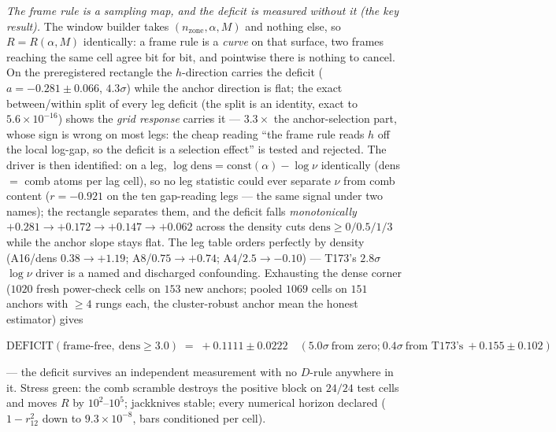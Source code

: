 \documentclass[11pt,a4paper]{article}
\begin{document}
\emph{The frame rule is a sampling map, and the deficit is measured
without it (the key result).} The window builder takes
$(n_{\mathrm{zone}},\alpha,M)$ and nothing else, so $R=R(\alpha,M)$
identically: a frame rule is a \emph{curve} on that surface, two frames
reaching the same cell agree bit for bit, and pointwise there is
nothing to cancel. On the preregistered rectangle the $h$-direction
carries the deficit ($a=-0.281\pm0.066$, $4.3\sigma$) while the anchor
direction is flat; the exact between/within split of every leg deficit
(the split is an identity, exact to $5.6\times10^{-16}$) shows the
\emph{grid response} carries it --- $3.3\times$ the anchor-selection
part, whose sign is wrong on most legs: the cheap reading ``the frame
rule reads $h$ off the local log-gap, so the deficit is a selection
effect'' is tested and rejected. The driver is then identified: on a
leg, $\log\mathrm{dens}=\mathrm{const}(\alpha)-\log\nu$ identically
(dens $=$ comb atoms per lag cell), so no leg statistic could ever
separate $\nu$ from comb content ($r=-0.921$ on the ten gap-reading
legs --- the same signal under two names); the rectangle separates
them, and the deficit falls \emph{monotonically} $+0.281\to+0.172\to
+0.147\to+0.062$ across the density cuts $\mathrm{dens}\ge0/0.5/1/3$
while the anchor slope stays flat. The leg table orders perfectly by
density (A16/dens $0.38\to+1.19$; A8/$0.75\to+0.74$; A4/$2.5\to-0.10$)
--- T173's $2.8\sigma$ $\log\nu$ driver is a named and discharged
confounding. Exhausting the dense corner ($1020$ fresh power-check
cells on $153$ new anchors; pooled $1069$ cells on $151$ anchors with
$\ge4$ rungs each, the cluster-robust anchor mean the honest estimator)
gives
\begin{keyeq}$\displaystyle
\mathrm{DEFICIT}(\text{frame-free},\ \mathrm{dens}\ge3.0)\;=\;
+0.1111\pm0.0222\quad(5.0\sigma\ \text{from zero;}\ 0.4\sigma\ \text{from
T173's}\ +0.155\pm0.102)$
\end{keyeq}
\noindent --- the deficit survives an independent measurement with no
$D$-rule anywhere in it. Stress green: the comb scramble destroys the
positive block on $24/24$ test cells and moves $R$ by
$10^{2}$--$10^{5}$; jackknives stable; every numerical horizon declared
($1-r_{12}^2$ down to $9.3\times10^{-8}$, bars conditioned per cell).
\end{document}
